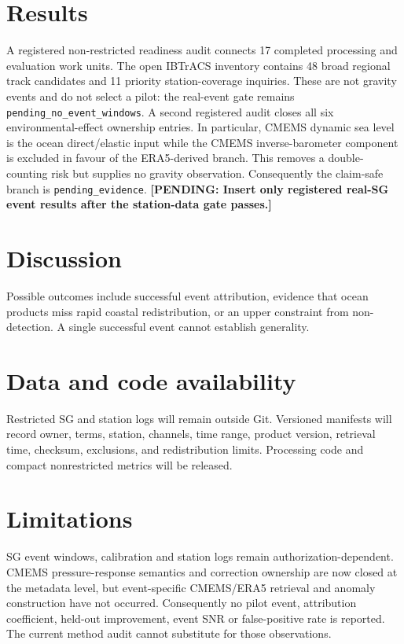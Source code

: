 \documentclass[11pt]{article}
\newcommand{\TyphoonPending}[1]{\textbf{[PENDING: #1]}}
\begin{document}
\section{Results}
A registered non-restricted readiness audit connects 17 completed processing
and evaluation work units. The open IBTrACS inventory contains 48 broad regional
track candidates and 11 priority station-coverage inquiries. These are not
gravity events and do not select a pilot: the real-event gate remains
\texttt{pending\_no\_event\_windows}. A second registered audit closes all six
environmental-effect ownership entries. In particular, CMEMS dynamic sea level
is the ocean direct/elastic input while the CMEMS inverse-barometer component is
excluded in favour of the ERA5-derived branch. This removes a double-counting
risk but supplies no gravity observation. Consequently the claim-safe branch is
\texttt{pending\_evidence}. \TyphoonPending{Insert only registered real-SG
event results after the station-data gate passes.}

\section{Discussion}
Possible outcomes include successful event attribution, evidence that ocean
products miss rapid coastal redistribution, or an upper constraint from
non-detection. A single successful event cannot establish generality.

\section{Data and code availability}
Restricted SG and station logs will remain outside Git. Versioned manifests will
record owner, terms, station, channels, time range, product version, retrieval
time, checksum, exclusions, and redistribution limits. Processing code and
compact nonrestricted metrics will be released.

\section{Limitations}
SG event windows, calibration and station logs remain authorization-dependent.
CMEMS pressure-response semantics and correction ownership are now closed at
the metadata level, but event-specific CMEMS/ERA5 retrieval and anomaly
construction have not occurred. Consequently no pilot event, attribution
coefficient, held-out improvement, event SNR or false-positive rate is reported.
The current method audit cannot substitute for those observations.



\end{document}
